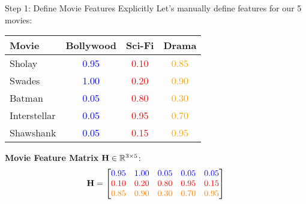 \documentclass{beamer}
\begin{document}
\begin{frame}{Step 1: Define Movie Features Explicitly}
Let's manually define features for our 5 movies:

\pause
\begin{center}
\renewcommand{\arraystretch}{1.3}
\begin{tabular}{l|ccc}
\toprule
\textbf{Movie} & \textbf{Bollywood} & \textbf{Sci-Fi} & \textbf{Drama} \\
\midrule
Sholay & \textcolor{blue}{0.95} & \textcolor{red}{0.10} & \textcolor{orange}{0.85} \\
Swades & \textcolor{blue}{1.00} & \textcolor{red}{0.20} & \textcolor{orange}{0.90} \\
Batman & \textcolor{blue}{0.05} & \textcolor{red}{0.80} & \textcolor{orange}{0.30} \\
Interstellar & \textcolor{blue}{0.05} & \textcolor{red}{0.95} & \textcolor{orange}{0.70} \\
Shawshank & \textcolor{blue}{0.05} & \textcolor{red}{0.15} & \textcolor{orange}{0.95} \\
\bottomrule
\end{tabular}
\end{center}

\pause
\textbf{Movie Feature Matrix} $\mathbf{H} \in \mathbb{R}^{3 \times 5}$:
\begin{equation*}
\mathbf{H} = \begin{bmatrix}
\textcolor{blue}{0.95} & \textcolor{blue}{1.00} & \textcolor{blue}{0.05} & \textcolor{blue}{0.05} & \textcolor{blue}{0.05} \\
\textcolor{red}{0.10} & \textcolor{red}{0.20} & \textcolor{red}{0.80} & \textcolor{red}{0.95} & \textcolor{red}{0.15} \\
\textcolor{orange}{0.85} & \textcolor{orange}{0.90} & \textcolor{orange}{0.30} & \textcolor{orange}{0.70} & \textcolor{orange}{0.95}
\end{bmatrix}
\end{equation*}
\end{frame}
\end{document}
